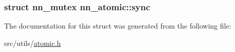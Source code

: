 \subsubsection[{sync}]{\setlength{\rightskip}{0pt plus 5cm}struct {\bf nn\+\_\+mutex} nn\+\_\+atomic\+::sync}\hypertarget{structnn__atomic_a9ca93c0867fdfbbe8414d7417be4cad2}{}\label{structnn__atomic_a9ca93c0867fdfbbe8414d7417be4cad2}


The documentation for this struct was generated from the following file\+:\begin{DoxyCompactItemize}
\item 
src/utils/\hyperlink{atomic_8h}{atomic.\+h}\end{DoxyCompactItemize}
